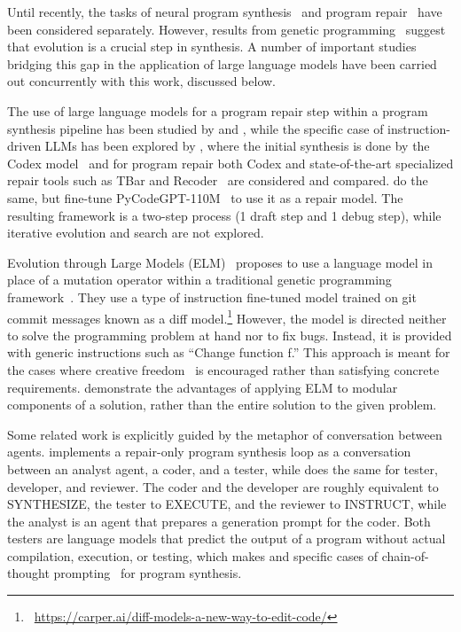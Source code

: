 
Until recently, the tasks of neural program synthesis~\cite{gulwaniProgramSynthesis2017} and program repair~\cite{gouesAutomatedProgramRepair2019,petke2018:genetic,bugfixing,zhang2024systematic} have been considered separately.
However, results from genetic programming~\cite{sobaniaRecentDevelopmentsProgram2021} suggest that evolution is a crucial step in synthesis.
A number of important studies bridging this gap in the application of large language models have been carried out concurrently with this work, discussed below.

The use of large language models for a program repair step within a program synthesis pipeline has been studied by \cite{joshi2022:repair} and \cite{guptaSynthesizeExecuteDebug2020}, 
while the specific case of instruction-driven LLMs has been explored by \cite{fanAutomatedRepairPrograms2023}, where the initial synthesis is done by the Codex model~\cite{chenEvaluatingLargeLanguage2021} and for program repair both Codex and state-of-the-art specialized repair tools such as TBar and Recoder~\cite{just2014:defects4j} are considered and compared. 
\cite{zhangSelfEditFaultAwareCode2023} do the same, but fine-tune PyCodeGPT-110M~\cite{zanCERTContinualPretraining2022} to use it as a repair model. 
The resulting framework is a two-step process (1 draft step and 1 debug step), while iterative evolution and search are not explored. 

Evolution through Large Models (ELM)~\cite{lehmanEvolutionLargeModels2022} proposes to use a language model in place of a mutation operator within a traditional genetic programming framework~\cite{koza1994:genetic}. They use a type of instruction fine-tuned model trained on git commit messages known as a diff model.\footnote{~\url{https://carper.ai/diff-models-a-new-way-to-edit-code/}}
However, the model is directed neither to solve the programming problem at hand nor to fix bugs.
Instead, it is provided with generic instructions such as ``Change function f.'' 
This approach is meant for the cases where creative freedom~\cite{stanleyWhyGreatnessCannot2015a} is encouraged rather than satisfying concrete requirements.
\cite{liu2023algorithm} demonstrate the advantages of applying ELM to modular components of a solution, rather than the entire solution to the given problem.

Some related work is explicitly guided by the metaphor of conversation between agents. 
\cite{zhang2023steam} implements a repair-only program synthesis loop as a conversation between an analyst agent, a coder, and a tester, while \cite{dongSelfcollaborationCodeGeneration2023} does the same for tester, developer, and reviewer. 
The coder and the developer are roughly equivalent to SYNTHESIZE, the tester to EXECUTE, and the reviewer to INSTRUCT, while the analyst is an agent that prepares a generation prompt for the coder. 
Both testers are language models that predict the output of a program without actual compilation, execution, or testing, which makes \cite{dongSelfcollaborationCodeGeneration2023} and \cite{zhang2023steam} specific cases of chain-of-thought prompting~\cite{yuBetterChainofThoughtPrompting2023} for program synthesis.

